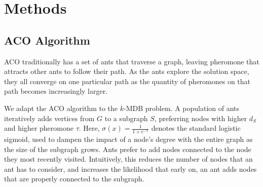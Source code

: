 \documentclass{article}
\begin{document}
\section{Methods}

\subsection{ACO Algorithm}

ACO traditionally has a set of ants that traverse a graph, leaving pheromone that attracts other ants to follow their path. As the ants explore the solution space, they all converge on one particular path as the quantity of pheromones on that path becomes increasingly larger.

We adapt the ACO algorithm to the $k$-MDB problem. A population of ants iteratively adds vertices from $G$ to a subgraph $S$, preferring nodes with higher $d_S$ and higher pheromone $\tau$. Here, $\sigma(x) = \frac{1}{1+e^{-x}}$ denotes the standard logistic sigmoid, used to dampen the impact of a node's degree with the entire graph as the size of the subgraph grows.
Ants prefer to add nodes connected to the node they most recently visited. Intuitively, this reduces the number of nodes that an ant has to consider, and increases the likelihood that early on, an ant adds nodes that are properly connected to the subgraph.
\end{document}
